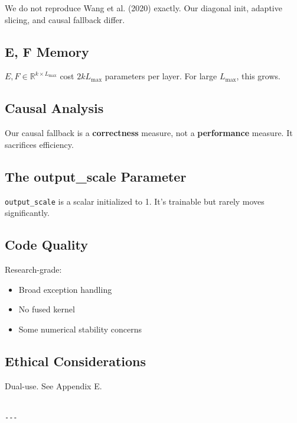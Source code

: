 We do not reproduce Wang et al. (2020) exactly. Our diagonal init, adaptive 
slicing, and causal fallback differ.

\subsection{E, F Memory}

$E, F \in \mathbb{R}^{k \times L_\text{max}}$ cost $2 k L_\text{max}$ 
parameters per layer. For large $L_\text{max}$, this grows.

\subsection{Causal Analysis}

Our causal fallback is a \textbf{correctness} measure, not a \textbf{performance} 
measure. It sacrifices efficiency.

\subsection{The output\_scale Parameter}

\texttt{output\_scale} is a scalar initialized to 1. It's trainable but rarely 
moves significantly.

\subsection{Code Quality}

Research-grade:
\begin{itemize}
\item Broad exception handling
\item No fused kernel
\item Some numerical stability concerns

\end{itemize}
\subsection{Ethical Considerations}

Dual-use. See Appendix E.
\begin{lstlisting}

---
\end{lstlisting}